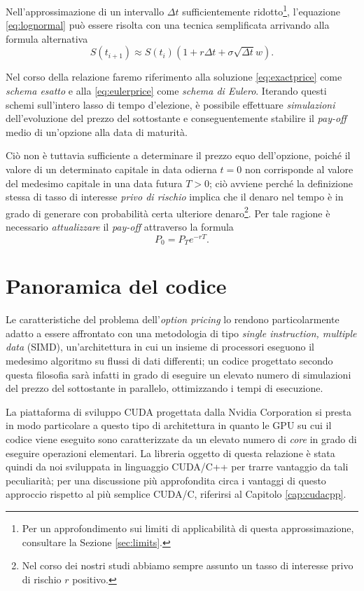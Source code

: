 Nell'approssimazione di un intervallo $\Delta t$ sufficientemente ridotto\footnote{Per un approfondimento sui limiti di applicabilità di questa approssimazione, consultare la Sezione \ref{sec:limits}.}, l'equazione \eqref{eq:lognormal} può essere risolta con una tecnica semplificata arrivando alla formula alternativa
\begin{equation}
    S(t_{i+1}) \approx S(t_i) \left(1 + r \Delta t + \sigma \sqrt{\Delta t} w\right).
    \label{eq:eulerprice}
\end{equation}

Nel corso della relazione faremo riferimento alla soluzione \eqref{eq:exactprice} come \textit{schema esatto} e alla \eqref{eq:eulerprice} come \textit{schema di Eulero}. Iterando questi schemi sull'intero lasso di tempo d'elezione, è possibile effettuare \textit{simulazioni} dell'evoluzione del prezzo del sottostante e conseguentemente stabilire il \textit{pay-off} medio di un'opzione alla data di maturità.

Ciò non è tuttavia sufficiente a determinare il prezzo equo dell'opzione, poiché il valore di un determinato capitale in data odierna $t=0$ non corrisponde al valore del medesimo capitale in una data futura $T>0$; ciò avviene perché la definizione stessa di tasso di interesse \textit{privo di rischio} implica che il denaro nel tempo è in grado di generare con probabilità certa ulteriore denaro\footnote{Nel corso dei nostri studi abbiamo sempre assunto un tasso di interesse privo di rischio $r$ positivo.}. Per tale ragione è necessario \textit{attualizzare} il \textit{pay-off} attraverso la formula
\begin{equation}
    P_0 = P_T e^{-rT}.
    \label{actualization}
\end{equation}


\section{Panoramica del codice} \label{sec:code_generics}
Le caratteristiche del problema dell'\textit{option pricing} lo rendono particolarmente adatto a essere affrontato con una metodologia di tipo \textit{single instruction, multiple data} (SIMD), un'architettura in cui un insieme di processori eseguono il medesimo algoritmo su flussi di dati differenti; un codice progettato secondo questa filosofia sarà infatti in grado di eseguire un elevato numero di simulazioni del prezzo del sottostante in parallelo, ottimizzando i tempi di esecuzione.

La piattaforma di sviluppo CUDA progettata dalla Nvidia Corporation si presta in modo particolare a questo tipo di architettura in quanto le GPU su cui il codice viene eseguito sono caratterizzate da un elevato numero di \textit{core} in grado di eseguire operazioni elementari. La libreria oggetto di questa relazione è stata quindi da noi sviluppata in linguaggio CUDA/C++ per trarre vantaggio da tali peculiarità; per una discussione più approfondita circa i vantaggi di questo approccio rispetto al più semplice CUDA/C, riferirsi al Capitolo \ref{cap:cudacpp}.

